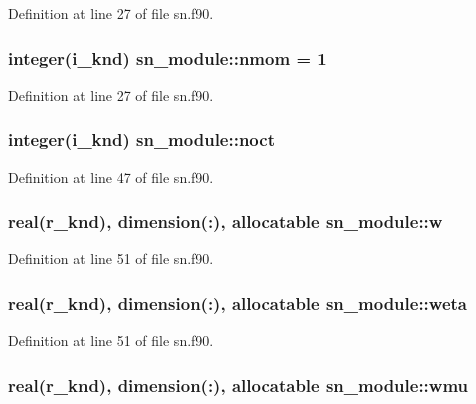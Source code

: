 Definition at line 27 of file sn.\-f90.

\hypertarget{classsn__module_ad3d327af15ae17449d60cbeddafa7b32}{
\subsubsection[{nmom}]{\setlength{\rightskip}{0pt plus 5cm}integer(i\-\_\-knd) sn\-\_\-module\-::nmom = 1}}\label{classsn__module_ad3d327af15ae17449d60cbeddafa7b32}


Definition at line 27 of file sn.\-f90.

\hypertarget{classsn__module_a981cf289719fc9d8b6be965decbf841a}{
\subsubsection[{noct}]{\setlength{\rightskip}{0pt plus 5cm}integer(i\-\_\-knd) sn\-\_\-module\-::noct}}\label{classsn__module_a981cf289719fc9d8b6be965decbf841a}


Definition at line 47 of file sn.\-f90.

\hypertarget{classsn__module_a109cb91fae331094d4e39d49580b30d3}{
\subsubsection[{w}]{\setlength{\rightskip}{0pt plus 5cm}real(r\-\_\-knd), dimension(\-:), allocatable sn\-\_\-module\-::w}}\label{classsn__module_a109cb91fae331094d4e39d49580b30d3}


Definition at line 51 of file sn.\-f90.

\hypertarget{classsn__module_ae34946f144f7ac3c298cc15fb0ba7f1d}{
\subsubsection[{weta}]{\setlength{\rightskip}{0pt plus 5cm}real(r\-\_\-knd), dimension(\-:), allocatable sn\-\_\-module\-::weta}}\label{classsn__module_ae34946f144f7ac3c298cc15fb0ba7f1d}


Definition at line 51 of file sn.\-f90.

\hypertarget{classsn__module_a184aa5bf38e29bc2afe65a69d4d26551}{
\subsubsection[{wmu}]{\setlength{\rightskip}{0pt plus 5cm}real(r\-\_\-knd), dimension(\-:), allocatable sn\-\_\-module\-::wmu}}\label{classsn__module_a184aa5bf38e29bc2afe65a69d4d26551}


